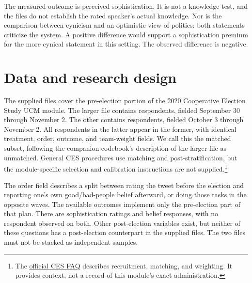\documentclass[11pt]{article}
\begin{document}
The measured outcome is perceived sophistication. It is not a knowledge test,
and the files do not establish the rated speaker's actual knowledge. Nor is
the comparison between cynicism and an optimistic view of politics: both
statements criticize the system. A positive difference would support a
sophistication premium for the more cynical statement in this setting. The
observed difference is negative.

\section{Data and research design}

The supplied files cover the pre-election portion of the 2020 Cooperative
Election Study UCM module. The larger file contains \FullN{} respondents,
fielded September 30 through November 2. The other contains \MatchedN{}
respondents, fielded October 3 through November 2. All respondents in the latter
appear in the former, with identical treatment, order, outcome, and team-weight
fields. We call this the matched subset, following the companion codebook's
description of the larger file as unmatched. General CES procedures use matching
and post-stratification, but the module-specific selection and calibration
instructions are not supplied.\footnote{The
\href{https://tischcollege.tufts.edu/research-faculty/research-centers/cooperative-election-study/cooperative-election-study-faqs}{official CES FAQ}
describes recruitment, matching, and weighting. It provides context, not a
record of this module's exact administration.}

The order field describes a split between rating the tweet before the election
and reporting one's own good/bad-people belief afterward, or doing those tasks
in the opposite waves. The available outcomes implement only the pre-election
part of that plan. There are \RatingN{} sophistication ratings and \BeliefN{}
belief responses, with no respondent observed on both. Other post-election
variables exist, but neither of these questions has a post-election counterpart
in the supplied files. The two files must not be stacked as independent samples.

\begin{table}[htbp]
\centering

\caption{Question routing in the full file. Tweet assignment is recorded for
both routes. Only the sophistication route provides a rating outcome; the
belief route is not another rating sample. Every respondent answers the
question assigned to their pre-election route.}
\label{tab:flow}
\end{table}
\end{document}
